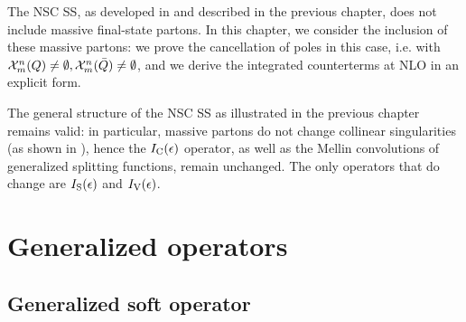 
The NSC SS, as developed in \cite{rontsch-2023, rontsch-2503, rontsch-2509} and described in the previous chapter, does not include massive final-state partons. In this chapter, we consider the inclusion of these massive partons: we prove the cancellation of poles in this case, i.e. with $ \mathcal{X}^{n}_{m}(Q) \neq \emptyset , \mathcal{X}^{n}_{m}(\bar{Q}) \neq \emptyset $, and we derive the integrated counterterms at NLO in an explicit form.

The general structure of the NSC SS as illustrated in the previous chapter remains valid: in particular, massive partons do not change collinear singularities (as shown in ), hence the $ I_\text{C}(\epsilon) $ operator, as well as the Mellin convolutions of generalized splitting functions, remain unchanged. The only operators that do change are $ I_\text{S}(\epsilon) $ and $ I_\text{V}(\epsilon) $.

\section{Generalized operators}

\subsection{Generalized soft operator}
\label{ssec:soft-gen}

